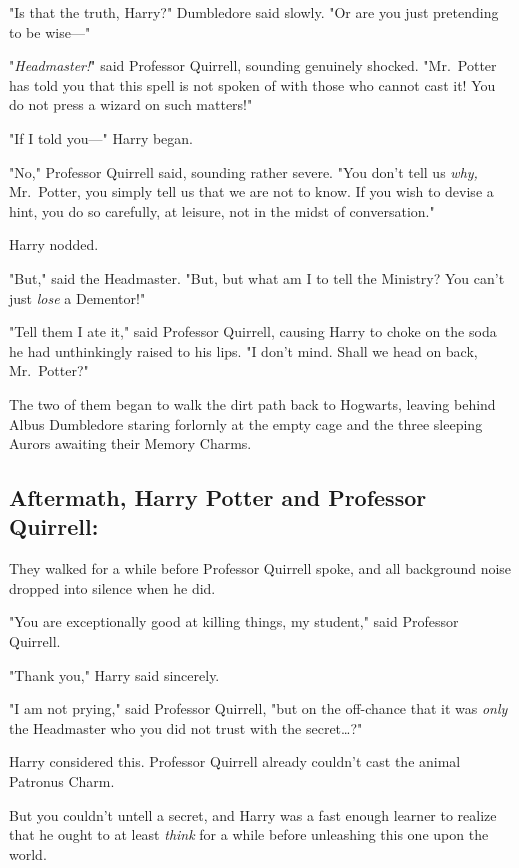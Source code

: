 "Is that the truth, Harry?" Dumbledore said slowly. "Or are you just pretending 
to be wise---"

"\emph{Headmaster!}" said Professor Quirrell, sounding genuinely shocked. 
"Mr.~Potter has told you that this spell is not spoken of with those who cannot 
cast it! You do not press a wizard on such matters!"

"If I told you---" Harry began.

"No," Professor Quirrell said, sounding rather severe. "You don't tell us 
\emph{why,} Mr.~Potter, you simply tell us that we are not to know. If you wish 
to devise a hint, you do so carefully, at leisure, not in the midst of 
conversation."

Harry nodded.

"But," said the Headmaster. "But, but what am I to tell the Ministry? You can't 
just \emph{lose} a Dementor!"

"Tell them I ate it," said Professor Quirrell, causing Harry to choke on the 
soda he had unthinkingly raised to his lips. "I don't mind. Shall we head on 
back, Mr.~Potter?"

The two of them began to walk the dirt path back to Hogwarts, leaving behind 
Albus Dumbledore staring forlornly at the empty cage and the three sleeping 
Aurors awaiting their Memory Charms.
\sbreak
\vspace{-2\baselineskip}
\subsection{Aftermath, Harry Potter and Professor Quirrell:}

They walked for a while before Professor Quirrell spoke, and all background 
noise dropped into silence when he did.

"You are exceptionally good at killing things, my student," said Professor 
Quirrell.

"Thank you," Harry said sincerely.

"I am not prying," said Professor Quirrell, "but on the off-chance that it was 
\emph{only} the Headmaster who you did not trust with the secret{\ldots}?"

Harry considered this. Professor Quirrell already couldn't cast the animal 
Patronus Charm.

But you couldn't untell a secret, and Harry was a fast enough learner to 
realize that he ought to at least \emph{think} for a while before unleashing 
this one upon the world.

